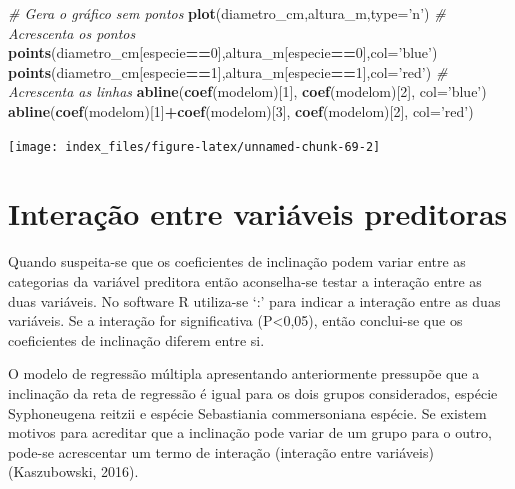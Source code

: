 \documentclass[12pt,brazil,oneside]{book}
\newenvironment{Shaded}{\begin{snugshade}}{\end{snugshade}}
\newcommand{\CommentTok}[1]{\textcolor[rgb]{0.56,0.35,0.01}{\textit{#1}}}
\newcommand{\DataTypeTok}[1]{\textcolor[rgb]{0.13,0.29,0.53}{#1}}
\newcommand{\DecValTok}[1]{\textcolor[rgb]{0.00,0.00,0.81}{#1}}
\newcommand{\KeywordTok}[1]{\textcolor[rgb]{0.13,0.29,0.53}{\textbf{#1}}}
\newcommand{\NormalTok}[1]{#1}
\newcommand{\OperatorTok}[1]{\textcolor[rgb]{0.81,0.36,0.00}{\textbf{#1}}}
\newcommand{\StringTok}[1]{\textcolor[rgb]{0.31,0.60,0.02}{#1}}
\begin{document}
\begin{Shaded}
\begin{Highlighting}[]
\CommentTok{# Gera o gráfico sem pontos}
\KeywordTok{plot}\NormalTok{(diametro_cm,altura_m,}\DataTypeTok{type=}\StringTok{'n'}\NormalTok{) }
\CommentTok{# Acrescenta os pontos}
\KeywordTok{points}\NormalTok{(diametro_cm[especie}\OperatorTok{==}\DecValTok{0}\NormalTok{],altura_m[especie}\OperatorTok{==}\DecValTok{0}\NormalTok{],}\DataTypeTok{col=}\StringTok{'blue'}\NormalTok{)}
\KeywordTok{points}\NormalTok{(diametro_cm[especie}\OperatorTok{==}\DecValTok{1}\NormalTok{],altura_m[especie}\OperatorTok{==}\DecValTok{1}\NormalTok{],}\DataTypeTok{col=}\StringTok{'red'}\NormalTok{)}
\CommentTok{# Acrescenta as linhas}
\KeywordTok{abline}\NormalTok{(}\KeywordTok{coef}\NormalTok{(modelom)[}\DecValTok{1}\NormalTok{], }\KeywordTok{coef}\NormalTok{(modelom)[}\DecValTok{2}\NormalTok{], }\DataTypeTok{col=}\StringTok{'blue'}\NormalTok{)}
\KeywordTok{abline}\NormalTok{(}\KeywordTok{coef}\NormalTok{(modelom)[}\DecValTok{1}\NormalTok{]}\OperatorTok{+}\KeywordTok{coef}\NormalTok{(modelom)[}\DecValTok{3}\NormalTok{], }\KeywordTok{coef}\NormalTok{(modelom)[}\DecValTok{2}\NormalTok{], }\DataTypeTok{col=}\StringTok{'red'}\NormalTok{)}
\end{Highlighting}
\end{Shaded}

\begin{center}\texttt{[image: index\_files/figure-latex/unnamed-chunk-69-2]} \end{center}

\hypertarget{interacao-entre-variaveis-preditoras}{%
\section{Interação entre variáveis preditoras}\label{interacao-entre-variaveis-preditoras}}

Quando suspeita-se que os coeficientes de inclinação podem variar entre as categorias da variável preditora então aconselha-se testar a interação entre as duas variáveis. No software R utiliza-se `:' para indicar a interação entre as duas variáveis. Se a interação for significativa (P\textless{}0,05), então conclui-se que os coeficientes de inclinação diferem entre si.

O modelo de regressão múltipla apresentando anteriormente pressupõe que a inclinação da reta de regressão é igual para os dois grupos considerados, espécie Syphoneugena reitzii e espécie Sebastiania commersoniana espécie. Se existem motivos para acreditar que a inclinação pode variar de um grupo para o outro, pode-se acrescentar um termo de interação (interação entre variáveis) (Kaszubowski, 2016).
\end{document}
